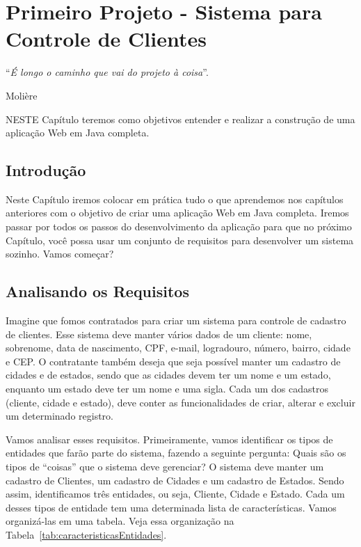 \chapter{Primeiro Projeto - Sistema para Controle de Clientes}
\epigraph{``\textit{É longo o caminho que vai do projeto à coisa}''.}{Molière}

\lettrine[lines=4, lhang=0.1, lraise=0, loversize=0.2, findent=0.1em]{\textcolor{corAzulTema}{N}}{ESTE} Capítulo teremos como objetivos entender e realizar a construção de uma aplicação Web em Java completa.


\section{Introdução}


Neste Capítulo iremos colocar em prática tudo o que aprendemos nos capítulos anteriores com o objetivo de criar uma aplicação Web em Java completa. Iremos passar por todos os passos do desenvolvimento da aplicação para que no próximo Capítulo, você possa usar um conjunto de requisitos para desenvolver um sistema sozinho. Vamos começar?


\section{Analisando os Requisitos}

Imagine que fomos contratados para criar um sistema para controle de cadastro de clientes. Esse sistema deve manter vários dados de um cliente: nome, sobrenome, data de nascimento, CPF, e-mail, logradouro, número, bairro, cidade e CEP. O contratante também deseja que seja possível manter um cadastro de cidades e de estados, sendo que as cidades devem ter um nome e um estado, enquanto um estado deve ter um nome e uma sigla. Cada um dos cadastros (cliente, cidade e estado), deve conter as funcionalidades de criar, alterar e excluir um determinado registro.

Vamos analisar esses requisitos. Primeiramente, vamos identificar os tipos de entidades que farão parte do sistema, fazendo a seguinte pergunta: Quais são os tipos de ``coisas'' que o sistema deve gerenciar? O sistema deve manter um cadastro de Clientes, um cadastro de Cidades e um cadastro de Estados. Sendo assim, identificamos três entidades, ou seja, Cliente, Cidade e Estado.
Cada um desses tipos de entidade tem uma determinada lista de características. Vamos organizá-las em uma tabela. Veja essa organização na Tabela~\ref{tab:caracteristicasEntidades}.

